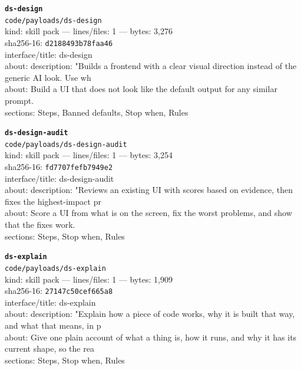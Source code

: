\noindent\textbf{\texttt{ds-design}}\\
\texttt{code/payloads/ds-design}\\
kind: skill pack --- lines/files: 1 --- bytes: 3,276\\
sha256-16: \texttt{d2188493b78faa46}\\
interface/title: ds-design\\
about: description: "Builds a frontend with a clear visual direction instead of the generic AI look. Use wh\\
about: Build a UI that does not look like the default output for any similar prompt.\\
sections: Steps, Banned defaults, Stop when, Rules\\
\vspace*{6.0pt}

\noindent\textbf{\texttt{ds-design-audit}}\\
\texttt{code/payloads/ds-design-audit}\\
kind: skill pack --- lines/files: 1 --- bytes: 3,254\\
sha256-16: \texttt{fd7707fefb7949e2}\\
interface/title: ds-design-audit\\
about: description: "Reviews an existing UI with scores based on evidence, then fixes the highest-impact pr\\
about: Score a UI from what is on the screen, fix the worst problems, and show that the fixes work.\\
sections: Steps, Stop when, Rules\\
\vspace*{6.0pt}

\noindent\textbf{\texttt{ds-explain}}\\
\texttt{code/payloads/ds-explain}\\
kind: skill pack --- lines/files: 1 --- bytes: 1,909\\
sha256-16: \texttt{27147c50cef665a8}\\
interface/title: ds-explain\\
about: description: "Explain how a piece of code works, why it is built that way, and what that means, in p\\
about: Give one plain account of what a thing is, how it runs, and why it has its current shape, so the rea\\
sections: Steps, Stop when, Rules\\
\vspace*{6.0pt}

